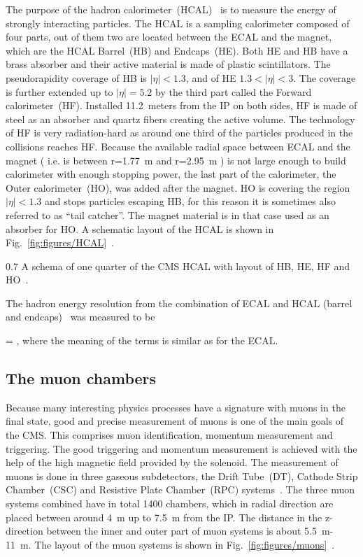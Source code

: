 The purpose of the hadron calorimeter~(HCAL)~\cite{tdrHCAL} is to measure the energy of strongly interacting particles.  The HCAL is a sampling calorimeter composed of four parts, out of them two are located between the ECAL and the magnet, which are the HCAL Barrel~(HB) and Endcaps~(HE). Both HE and HB have a brass absorber and their active material is made of plastic scintillators. The pseudorapidity coverage of HB is $|\eta|<1.3$, and of HE $1.3<|\eta|<3$. The coverage is further extended up to $|\eta|=5.2$ by the third part called the Forward calorimeter~(HF). Installed 11.2~meters from the IP on both sides, HF is made of steel as an absorber and quartz fibers creating the active volume. The technology of HF is very radiation-hard as around one third of the particles produced in the collisions reaches HF. Because the available radial space between ECAL and the magnet ( i.e. is between r=1.77~m and r=2.95~m ) is not large enough to build calorimeter with enough stopping power, the last part of the calorimeter, the Outer calorimeter~(HO), was added after the magnet. HO is covering the region $|\eta|<1.3$ and stops particles escaping HB, for this reason it is sometimes also referred to as ``tail catcher''. The magnet material is in that case used as an absorber for HO. A schematic layout of the HCAL is shown in Fig.~\ref{fig:figures/HCAL}~\cite{Chatrchyan:2008aa}.

                 {0.7}       
                 {A schema of one quarter of the CMS HCAL with layout of HB, HE, HF and HO~\cite{Chatrchyan:2008aa}. }

The hadron energy resolution from the combination of ECAL and HCAL (barrel and endcaps)~\cite{Chatrchyan:2009ag} was measured to be


{
  =   ,
}
where the meaning of the terms is similar as for the ECAL.

\subsection{The muon chambers}

Because many interesting physics processes have a signature with muons in the final state, good and precise measurement of muons is one of the main goals of the CMS. This comprises muon identification, momentum measurement and triggering. The good triggering and momentum measurement is achieved with the help of the high magnetic field provided by the solenoid. The measurement of muons is done in three gaseous subdetectors, the Drift Tube~(DT), Cathode Strip Chamber~(CSC) and Resistive Plate Chamber~(RPC) systems~\cite{tdrMuon}. The three muon systems combined have in total 1400 chambers, which in radial direction are placed between around 4~m up to 7.5~m from the IP. The distance in the z-direction between the inner and outer part of muon systems is about 5.5~m-11~m. The layout of the muon systems is shown in Fig.~\ref{fig:figures/muons}~\cite{Chatrchyan:2013sba}.

